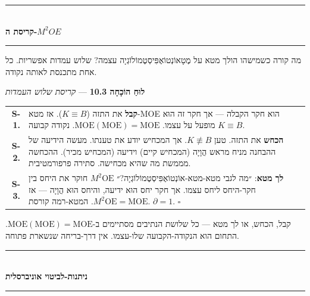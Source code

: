 \documentclass[10pt, openany, oneside]{book}
\renewcommand{\normalsize}{\fontsize{10}{13}\selectfont}
\renewcommand{\footnotesize}{\fontsize{8.5}{11}\selectfont}
\begin{document}
\begin{center}
    \rule{0.3\textwidth}{0.4pt}\\[0.5em]
    {\normalsize\bfseries\textsc{קריסת ה-$M^2OE$}}\\[0.3em]
    \rule{0.3\textwidth}{0.4pt}
\end{center}

\vspace{1em}

\noindent מה קורה כשמישהו הולך מטא על מֶטָאוֹנְטוֹאֶפִּיסְטֶמוֹלוֹגְיָה עצמה? שלוש עמדות אפשריות. כל אחת מתכנסת לאותה נקודה.

\vspace{0.5em}

\textbf{לוּחַ הוֹכָחָה 10.3} --- \textit{קריסת שלוש העמדות}

\vspace{0.5em}

{\footnotesize
\noindent\begin{tabular}{r p{}}
\textbf{S-1.} & \textbf{קבל} את התזה ($K \equiv B$). אז מטא-MOE הוא חקר הקבלה — אך חקר זה הוּא $K \equiv B$ מופעל על עצמו. $\text{MOE}(\text{MOE}) = \text{MOE}$. נקודה קבועה. \\[0.3em]
\textbf{S-2.} & \textbf{הכחש} את התזה. טען $K \not\equiv B$. אך המכחיש יודע את טענתו. מעשה הידיעה של ההבחנה מניח מראש הֲוָיָה (המכחיש קיים) וידיעה (המכחיש מכיר). ההכחשה מממשת מה שהיא מכחישה. סתירה פרפורמטיבית. \\[0.3em]
\textbf{S-3.} & \textbf{לך מטא}: ״מה לגבי מטא-מטא-אוֹנְטוֹאֶפִּיסְטֶמוֹלוֹגְיָה?״ $M^2\text{OE}$ חוקר את היחס בין חקר-היחס ליחס עצמו. אך חקר יחס הוּא ידיעה, והיחס הוּא הֲוָיָה — אז $M^2\text{OE} = \text{MOE}$. המטא-רמה קורסת. $\partial = 1$. $\square$ \\[0.3em]
\end{tabular}
}

\vspace{0.8em}

\noindent קבל, הכחש, או לך מטא — כל שלושת הנתיבים מסתיימים ב-$\text{MOE}(\text{MOE}) = \text{MOE}$. התחום הוא הנקודה-הקבועה שלו-עצמו. אין דרך-בריחה שנשארת פתוחה.

\vspace{1.5em}


\begin{center}
    \rule{0.3\textwidth}{0.4pt}\\[0.5em]
    {\normalsize\bfseries\textsc{ניתנות-לביטוי אוניברסלית}}\\[0.3em]
    \rule{0.3\textwidth}{0.4pt}
\end{center}
\end{document}
